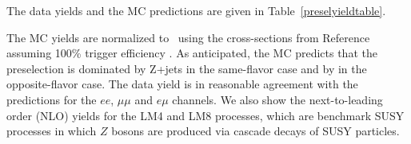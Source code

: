 The data yields and the MC predictions are given in Table~\ref{preselyieldtable}.

The MC yields are normalized to \lumi\ using the cross-sections
from Reference~\cite{ref:xsec} assuming 100\% trigger efficiency 
.
As anticipated, the MC predicts that the preselection is dominated by Z+jets in the same-flavor 
case and by \ttbar in the opposite-flavor case.  
The data yield is in reasonable agreement with the predictions for the $ee$, $\mu\mu$ and $e\mu$ channels.
We also show the next-to-leading order (NLO) yields for the LM4 and LM8 processes, which are benchmark
SUSY processes in which $Z$ bosons are produced via cascade decays of SUSY particles. 




